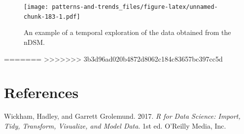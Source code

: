 \documentclass[]{book}
\begin{document}
\begin{figure}
\centering
\texttt{[image: patterns-and-trends\_files/figure-latex/unnamed-chunk-183-1.pdf]}
\caption{\label{fig:unnamed-chunk-183}An example of a temporal exploration of the data obtained from the nDSM.}
\end{figure}

=======
>>>>>>> 3b3d96ad020b4872d8062c184c83657bc397cc5d
\hypertarget{references}{%
\chapter*{References}\label{references}}

\hypertarget{refs}{}
\leavevmode\hypertarget{ref-wickham2017}{}%
Wickham, Hadley, and Garrett Grolemund. 2017. \emph{R for Data Science: Import, Tidy, Transform, Visualize, and Model Data}. 1st ed. O'Reilly Media, Inc.
\end{document}
